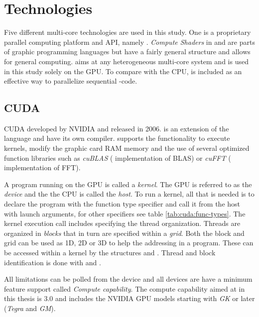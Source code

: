 \chapter{Technologies}\label{cha:technologies}

\newcommand{\procwidth}{{\textwidth * 3 / 4}}

Five different multi-core technologies are used in this study. One is a proprietary parallel computing platform and \gls{API}, namely {\CU}. \textit{Compute Shaders} in {\GL} and {\DX} are parts of graphic programming languages but have a fairly general structure and allows for general computing. {\OCL} aims at any heterogeneous multi-core system and is used in this study solely on the \gls{GPU}. To compare with the \gls{CPU}, {\OMP} is included as an effective way to parallelize sequential {\CPP}-code.

\section{CUDA}

\gls{CUDA} developed by NVIDIA and released in 2006. {\CU} is an extension of the {\CPP} language and have its own compiler. {\CU} supports the functionality to execute kernels, modify the graphic card RAM memory and the use of several optimized function libraries such as \textit{cuBLAS} ({\CU} implementation of \gls{BLAS}) or \textit{cuFFT} ({\CU} implementation of \gls{FFT}).

A program running on the \gls{GPU} is called a \emph{kernel}. The \gls{GPU} is referred to as the \textit{device} and the the CPU is called the \textit{host}. To run a {\CU} kernel, all that is needed is to declare the program with the function type specifier  and call it from the host with launch arguments, for other specifiers see table \ref{tab:cuda:func-types}. The kernel execution call includes specifying the thread organization. Threads are organized in \emph{blocks} that in turn are specified within a \emph{grid}. Both the block and grid can be used as \gls{1D}, \gls{2D} or \gls{3D} to help the addressing in a program. These can be accessed within a kernel by the structures  and . Thread and block identification is done with  and .

All limitations can be polled from the device and all devices are have a minimum feature support called \emph{Compute capability}. The compute capability aimed at in this thesis is $3.0$ and includes the NVIDIA \gls{GPU} models starting with \emph{GK} or later (\emph{Tegra} and \emph{GM}).

